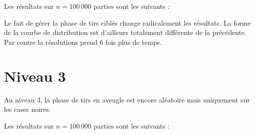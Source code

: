 Les résultats sur $n=100\,000$ parties sont les suivants :

\begin{center}
\end{center}

Le fait de gérer la phase de tirs ciblés change radicalement les résultats. La forme de la courbe de distribution est d'ailleurs totalement différente de la précédente.\\
Par contre la résolutions prend 6 fois plus de temps.
\newpage
\section{Niveau 3}
Au niveau 3, la phase de tirs en aveugle est encore aléatoire mais uniquement sur les cases noires.

Les résultats sur $n=100\,000$ parties sont les suivants :

\begin{center}
\end{center}

